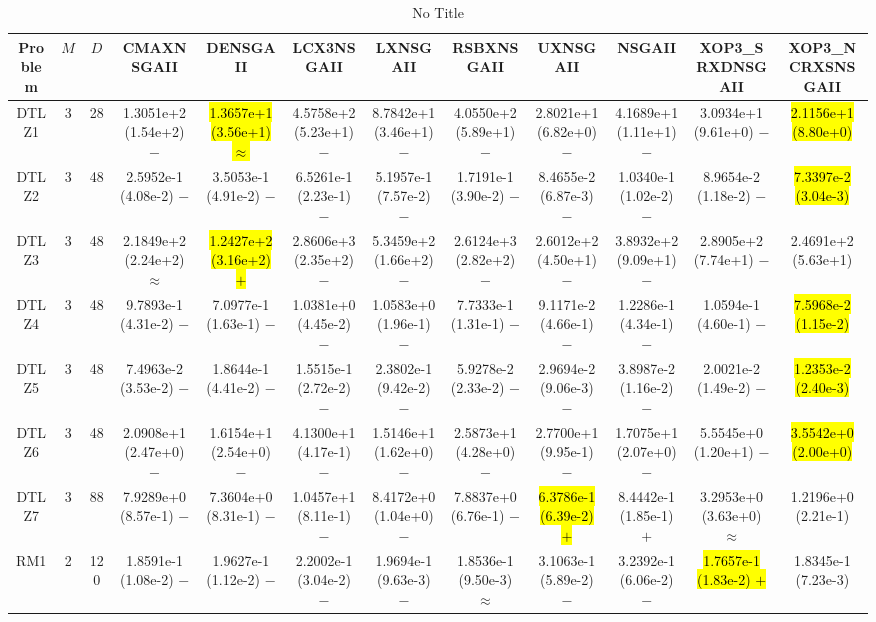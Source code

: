 \documentclass[journal]{IEEEtran}
\begin{document}
\begin{table*}[htbp]
\renewcommand{\arraystretch}{1.2}
\centering
\caption{No Title}
\begin{tabular}{cccccccccccc}
\toprule
Problem&$M$&$D$&CMAXNSGAII&DENSGAII&LCX3NSGAII&LXNSGAII&RSBXNSGAII&UXNSGAII&NSGAII&XOP3\_SRXDNSGAII&XOP3\_NCRXSNSGAII\\
\midrule
\multirow{1}{*}{DTLZ1}&3&28&1.3051e+2 (1.54e+2) $-$&\hl{1.3657e+1 (3.56e+1) $\approx$}&4.5758e+2 (5.23e+1) $-$&8.7842e+1 (3.46e+1) $-$&4.0550e+2 (5.89e+1) $-$&2.8021e+1 (6.82e+0) $-$&4.1689e+1 (1.11e+1) $-$&3.0934e+1 (9.61e+0) $-$&\hl{2.1156e+1 (8.80e+0)}\\
\hline
\multirow{1}{*}{DTLZ2}&3&48&2.5952e-1 (4.08e-2) $-$&3.5053e-1 (4.91e-2) $-$&6.5261e-1 (2.23e-1) $-$&5.1957e-1 (7.57e-2) $-$&1.7191e-1 (3.90e-2) $-$&8.4655e-2 (6.87e-3) $-$&1.0340e-1 (1.02e-2) $-$&8.9654e-2 (1.18e-2) $-$&\hl{7.3397e-2 (3.04e-3)}\\
\hline
\multirow{1}{*}{DTLZ3}&3&48&2.1849e+2 (2.24e+2) $\approx$&\hl{1.2427e+2 (3.16e+2) $+$}&2.8606e+3 (2.35e+2) $-$&5.3459e+2 (1.66e+2) $-$&2.6124e+3 (2.82e+2) $-$&2.6012e+2 (4.50e+1) $-$&3.8932e+2 (9.09e+1) $-$&2.8905e+2 (7.74e+1) $-$&2.4691e+2 (5.63e+1)\\
\hline
\multirow{1}{*}{DTLZ4}&3&48&9.7893e-1 (4.31e-2) $-$&7.0977e-1 (1.63e-1) $-$&1.0381e+0 (4.45e-2) $-$&1.0583e+0 (1.96e-1) $-$&7.7333e-1 (1.31e-1) $-$&9.1171e-2 (4.66e-1) $-$&1.2286e-1 (4.34e-1) $-$&1.0594e-1 (4.60e-1) $-$&\hl{7.5968e-2 (1.15e-2)}\\
\hline
\multirow{1}{*}{DTLZ5}&3&48&7.4963e-2 (3.53e-2) $-$&1.8644e-1 (4.41e-2) $-$&1.5515e-1 (2.72e-2) $-$&2.3802e-1 (9.42e-2) $-$&5.9278e-2 (2.33e-2) $-$&2.9694e-2 (9.06e-3) $-$&3.8987e-2 (1.16e-2) $-$&2.0021e-2 (1.49e-2) $-$&\hl{1.2353e-2 (2.40e-3)}\\
\hline
\multirow{1}{*}{DTLZ6}&3&48&2.0908e+1 (2.47e+0) $-$&1.6154e+1 (2.54e+0) $-$&4.1300e+1 (4.17e-1) $-$&1.5146e+1 (1.62e+0) $-$&2.5873e+1 (4.28e+0) $-$&2.7700e+1 (9.95e-1) $-$&1.7075e+1 (2.07e+0) $-$&5.5545e+0 (1.20e+1) $-$&\hl{3.5542e+0 (2.00e+0)}\\
\hline
\multirow{1}{*}{DTLZ7}&3&88&7.9289e+0 (8.57e-1) $-$&7.3604e+0 (8.31e-1) $-$&1.0457e+1 (8.11e-1) $-$&8.4172e+0 (1.04e+0) $-$&7.8837e+0 (6.76e-1) $-$&\hl{6.3786e-1 (6.39e-2) $+$}&8.4442e-1 (1.85e-1) $+$&3.2953e+0 (3.63e+0) $\approx$&1.2196e+0 (2.21e-1)\\
\hline
\multirow{1}{*}{RM1}&2&120&1.8591e-1 (1.08e-2) $-$&1.9627e-1 (1.12e-2) $-$&2.2002e-1 (3.04e-2) $-$&1.9694e-1 (9.63e-3) $-$&1.8536e-1 (9.50e-3) $\approx$&3.1063e-1 (5.89e-2) $-$&3.2392e-1 (6.06e-2) $-$&\hl{1.7657e-1 (1.83e-2) $+$}&1.8345e-1 (7.23e-3)\\

\end{tabular}
\end{table*}
\end{document}
